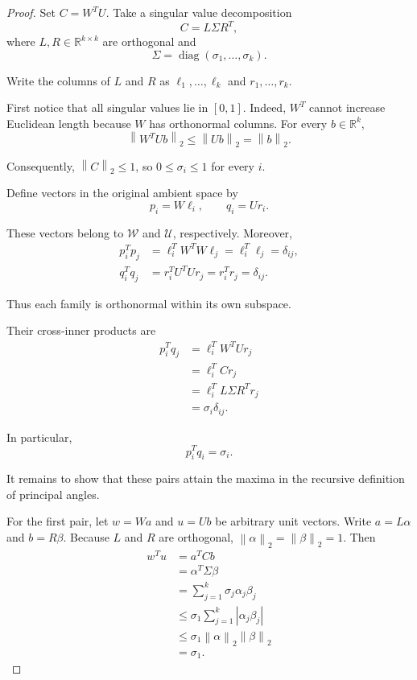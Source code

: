 \documentclass[14pt,letterpaper]{article}
\theoremstyle{plain}
\theoremstyle{definition}
\theoremstyle{remark}
\newcommand{\R}{\mathbb{R}}
\newcommand{\norm}[1]{\left\lVert #1 \right\rVert}
\DeclareMathOperator{\diag}{diag}
\begin{document}
\begin{proof}

Set $C=W^TU$. Take a singular value decomposition
\[
\boxed{C=L\Sigma R^T,}
\]
where $L,R\in\R^{k\times k}$ are orthogonal and
\[
\Sigma=\diag(\sigma_1,\ldots,\sigma_k).
\]

Write the columns of $L$ and $R$ as
$\ell_1,\ldots,\ell_k$ and $r_1,\ldots,r_k$.

First notice that all singular values lie in $[0,1]$.
Indeed, $W^T$ cannot increase Euclidean length because
$W$ has orthonormal columns. For every $b\in\R^k$,
\[
\norm{W^TUb}_2\leq\norm{Ub}_2=\norm{b}_2.
\]

Consequently, $\norm{C}_2\leq1$, so
$0\leq\sigma_i\leq1$ for every $i$.

Define vectors in the original ambient space by
\[
\boxed{p_i=W\ell_i,\qquad q_i=Ur_i.}
\]

These vectors belong to $\mathcal W$ and $\mathcal U$,
respectively. Moreover,
\[
\begin{aligned}
p_i^Tp_j&=\ell_i^TW^TW\ell_j
=\ell_i^T\ell_j=\delta_{ij},\\
q_i^Tq_j&=r_i^TU^TUr_j
=r_i^Tr_j=\delta_{ij}.
\end{aligned}
\]

Thus each family is orthonormal within its own subspace.

Their cross-inner products are
\[
\begin{aligned}
p_i^Tq_j
&=\ell_i^TW^TUr_j\\
&=\ell_i^TCr_j\\
&=\ell_i^TL\Sigma R^Tr_j\\
&=\sigma_i\delta_{ij}.
\end{aligned}
\]

In particular,
\[
\boxed{p_i^Tq_i=\sigma_i.}
\]

It remains to show that these pairs attain the maxima
in the recursive definition of principal angles.

For the first pair, let $w=Wa$ and $u=Ub$ be arbitrary
unit vectors. Write $a=L\alpha$ and $b=R\beta$.
Because $L$ and $R$ are orthogonal,
$\norm{\alpha}_2=\norm{\beta}_2=1$. Then
\[
\begin{aligned}
w^Tu
&=a^TCb\\
&=\alpha^T\Sigma\beta\\
&=\sum_{j=1}^k\sigma_j\alpha_j\beta_j\\
&\leq\sigma_1\sum_{j=1}^k|\alpha_j\beta_j|\\
&\leq\sigma_1\norm{\alpha}_2\norm{\beta}_2\\
&=\sigma_1.
\end{aligned}
\]


\end{proof}
\end{document}
